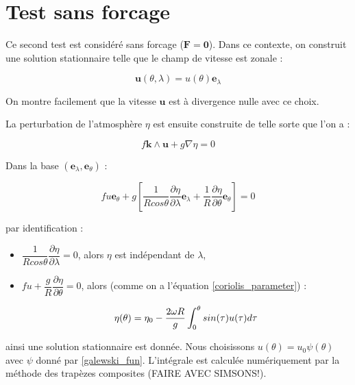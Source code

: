 \section{Test sans forcage}

Ce second test est considéré sans forcage ($\mathbf{F} = \mathbf{0}$). Dans ce contexte, on construit une solution stationnaire telle que le champ de vitesse est zonale :

$$\mathbf{u}(\theta, \lambda) = u(\theta) \mathbf{e}_{\lambda}$$

On montre facilement que la vitesse $ \mathbf{u}$ est à divergence nulle avec ce choix.

La perturbation de l'atmosphère $\eta$ est ensuite construite de telle sorte que l'on a :

\begin{equation}
f \mathbf{k} \wedge \mathbf{u} + g \nabla \eta = 0
\end{equation} 

Dans la base $(\mathbf{e}_{\lambda}, \mathbf{e}_{\theta})$ :

\begin{equation}
f u \mathbf{e}_{\theta} + g \left[ \dfrac{1}{R cos \theta} \dfrac{\partial \eta}{\partial \lambda} \mathbf{e}_{\lambda} + \dfrac{1}{R}\dfrac{\partial \eta}{\partial \theta} \mathbf{e}_{\theta} \right] = 0
\end{equation}

par identification :

\begin{itemize}
\item $\dfrac{1}{R cos \theta} \dfrac{\partial \eta}{\partial \lambda} = 0$, alors $\eta$ est indépendant de $\lambda$,

\item $f u + \dfrac{g}{R} \dfrac{\partial \eta}{\partial \theta} = 0$, alors (comme on a l'équation \eqref{coriolis_parameter}) :

\begin{equation}
\eta (\theta ) = \eta_0 - \dfrac{2 \omega R}{g} \displaystyle\int_0^{\theta} sin(\tau) u(\tau) d \tau
\end{equation} 
\end{itemize}

ainsi une solution stationnaire est donnée. Nous choisissons $u(\theta) = u_0 \psi( \theta )$ avec $\psi$ donné par \eqref{galewski_fun}. L'intégrale est calculée numériquement par la méthode des trapèzes composites (FAIRE AVEC SIMSONS!).

